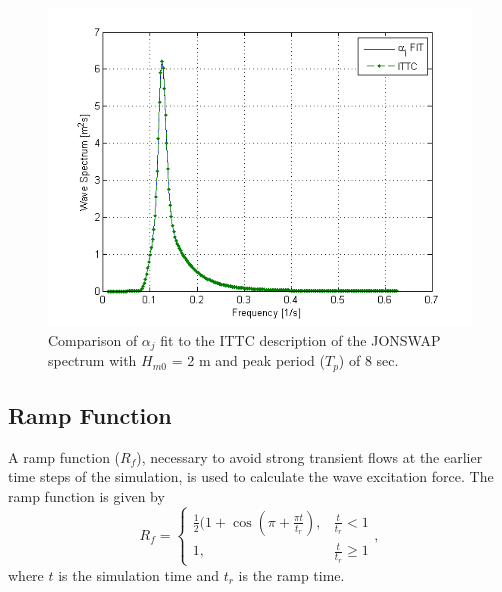 \begin{figure}[h]
\begin{centering}
\includegraphics[scale=0.9]{theoryManual/Figures/Jonswap.png}
\end{centering}
\noindent \centering{}\protect\caption{Comparison of $\alpha_{j}$ fit to the ITTC description of the JONSWAP spectrum with $H_{m0}$ = 2 m and peak period ($T_{p}$) of 8 sec.\label{fig:JONSWAP}}
\end{figure}

\subsection{Ramp Function}
\noindent A ramp function ($R_{f}$), necessary to avoid strong transient
flows at the earlier time steps of the simulation, is used to calculate
the wave excitation force. The ramp function is given by
\begin{equation}
R_{f}=\begin{cases}
\frac{1}{2}(1+\cos(\pi+\frac{\pi t}{t_{r}}), & \frac{t}{t_{r}}<1\\
1, & \frac{t}{t_{r}}\geq1
\end{cases},
\end{equation}
where $t$ is the simulation time and $t_{r}$ is the ramp time.

